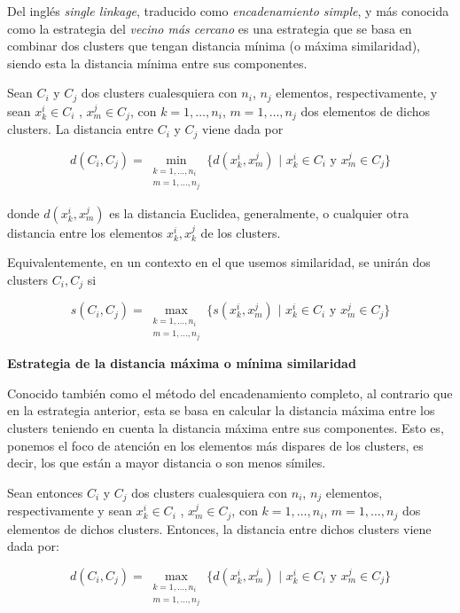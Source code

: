 Del inglés \textit{single linkage}, traducido como \textit{encadenamiento simple}, y más conocida como la estrategia del \textit{vecino más cercano} es una estrategia que
se basa en combinar dos clusters que tengan distancia mínima (o máxima similaridad), siendo esta la distancia mínima entre sus componentes. \newline

Sean $C_{i}$ y $C_{j}$ dos clusters cualesquiera con $n_{i}$, $n_{j}$ elementos, respectivamente, y sean $x^{i}_{k} \in C_{i}$ , $x^{j}_{m} \in C_{j}$, con $k=1,\dots,n_{i}$, $m=1,\dots,n_{j}$ dos elementos de dichos clusters. La 
distancia entre $C_{i}$ y $C_{j}$ viene dada por

\[
d(C_{i},C_{j}) = \min_{\substack{k=1,\dots,n_{i} \\ m=1,\dots,n_{j}}}\{d(x^{i}_{k},x^{j}_{m}) \text{ | } x^{i}_{k} \in C_{i} \text{ y } x^{j}_{m} \in C_{j}\}
\]

donde $d(x^{i}_{k},x^{j}_{m})$ es la distancia Euclidea, generalmente, o cualquier otra distancia entre los elementos $x^{i}_{k},x^{j}_{k}$ de los clusters. 

Equivalentemente, en un contexto en el que usemos similaridad, se unirán dos clusters $C_{i}, C_{j}$ si

\[
s(C_{i},C_{j}) = \max_{\substack{k=1,\dots,n_{i} \\ m=1,\dots,n_{j}}}\{s(x^{i}_{k},x^{j}_{m}) \text{ | } x^{i}_{k} \in C_{i} \text{ y } x^{j}_{m} \in C_{j}\}
\]

\textbf{Estrategia de la distancia máxima o mínima similaridad}

Conocido también como el método del encadenamiento completo, al contrario que en la estrategia anterior, esta se basa en calcular la distancia máxima 
entre los clusters teniendo en cuenta la distancia máxima entre sus componentes. Esto es, ponemos el foco de atención en los elementos más dispares de 
los clusters, es decir, los que están a mayor distancia o son menos símiles. \newline

Sean entonces $C_{i}$ y $C_{j}$ dos clusters cualesquiera con $n_{i}$, $n_{j}$ elementos, respectivamente y sean $x^{i}_{k} \in C_{i}$ , $x^{j}_{m} \in C_{j}$, 
con $k=1,\dots,n_{i}$, $m=1,\dots,n_{j}$ dos elementos de dichos clusters. Entonces, la distancia entre dichos clusters viene dada por:

\[
d(C_{i},C_{j}) = \max_{\substack{k=1,\dots,n_{i} \\ m=1,\dots,n_{j}}}\{d(x^{i}_{k},x^{j}_{m}) \text{ | } x^{i}_{k} \in C_{i} \text{ y } x^{j}_{m} \in C_{j}\}
\]


